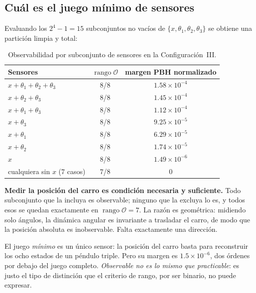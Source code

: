 \documentclass[11pt,letterpaper]{article}
\theoremstyle{definition}
\theoremstyle{plain}
\theoremstyle{remark}
\DeclareMathOperator{\rank}{rango}
\newcommand{\calO}{\mathcal{O}}
\begin{document}
\subsection{Cuál es el juego mínimo de sensores}

Evaluando los $2^4-1=15$ subconjuntos no vacíos de $\{x,\theta_1,\theta_2,\theta_3\}$
se obtiene una partición limpia y total:

\begin{table}[htbp]
  \centering\small
  \caption{Observabilidad por subconjunto de sensores en la Configuración~III.}
  \label{tab:sensores}
  \begin{tabular}{@{}lcc@{}}
    \toprule
    \textbf{Sensores} & $\rank\calO$ & \textbf{margen PBH normalizado}\\
    \midrule
    $x+\theta_1+\theta_2+\theta_3$ & 8/8 & $1.58\times10^{-4}$\\
    $x+\theta_2+\theta_3$ & 8/8 & $1.45\times10^{-4}$\\
    $x+\theta_1+\theta_3$ & 8/8 & $1.12\times10^{-4}$\\
    $x+\theta_3$ & 8/8 & $9.25\times10^{-5}$\\
    $x+\theta_1$ & 8/8 & $6.29\times10^{-5}$\\
    $x+\theta_2$ & 8/8 & $1.74\times10^{-5}$\\
    $x$ & 8/8 & $1.49\times10^{-6}$\\
    \midrule
    cualquiera sin $x$ (7 casos) & 7/8 & $0$\\
    \bottomrule
  \end{tabular}
\end{table}

\begin{clave}
\small
\textbf{Medir la posición del carro es condición necesaria y suficiente.} Todo
subconjunto que la incluya es observable; ninguno que la excluya lo es, y todos
esos se quedan exactamente en $\rank\calO=7$. La razón es geométrica: midiendo
solo ángulos, la dinámica angular es invariante a trasladar el carro, de modo
que la posición absoluta es inobservable. Falta exactamente una dirección.

El juego \emph{mínimo} es un único sensor: la posición del carro basta para
reconstruir los ocho estados de un péndulo triple. Pero su margen es
$1.5\times10^{-6}$, dos órdenes por debajo del juego completo. \emph{Observable
no es lo mismo que practicable}: es justo el tipo de distinción que el criterio
de rango, por ser binario, no puede expresar.
\end{clave}
\end{document}
